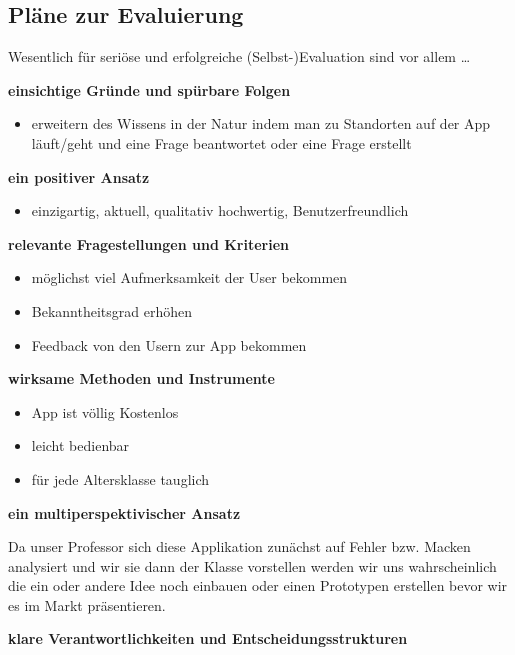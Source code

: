 \subsection{Pläne zur Evaluierung}


Wesentlich für seriöse und erfolgreiche (Selbst-)Evaluation sind vor allem …



\textbf {einsichtige Gründe und spürbare Folgen}
\begin{itemize}
		\item erweitern des Wissens in der Natur indem man zu Standorten auf der App läuft/geht und eine Frage beantwortet oder eine Frage erstellt
	\end{itemize}




\textbf {ein positiver Ansatz}

\begin{itemize}
		\item einzigartig, aktuell, qualitativ hochwertig, Benutzerfreundlich
\end{itemize}




\textbf {relevante Fragestellungen und Kriterien}

\begin{itemize}
		\item möglichst viel Aufmerksamkeit der User bekommen
		\item Bekanntheitsgrad erhöhen
		\item Feedback von den Usern zur App bekommen
	\end{itemize}




\textbf {wirksame Methoden und Instrumente}

\begin{itemize}
		\item App ist völlig Kostenlos
		\item leicht bedienbar
		\item für jede Altersklasse tauglich
\end{itemize}


\textbf {ein multiperspektivischer Ansatz}

Da unser Professor sich diese Applikation zunächst auf Fehler bzw. Macken analysiert und wir sie dann der Klasse vorstellen werden  wir uns wahrscheinlich die ein oder andere Idee noch einbauen oder einen Prototypen erstellen bevor wir es im Markt präsentieren.

\textbf {klare Verantwortlichkeiten und Entscheidungsstrukturen}


